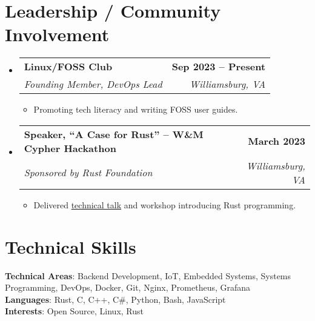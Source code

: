 \documentclass[letterpaper, 11pt]{article}
\makeatletter
\newcommand{\resumeItem}[1]{ \item\small{ {#1 \vspace{-2pt}} } }
\newcommand{\resumeSubheading}[4]{
\vspace{-2pt}
\item
\begin{tabular*}{1.0\textwidth}[t]{l@{\extracolsep{\fill}}r}
	\textbf{#1}       & \textbf{\small #2} \\
	\textit{\small#3} & \textit{\small #4} \\
\end{tabular*}
\vspace{-8pt}
}
\newcommand{\resumeSubHeadingListStart}{\begin{itemize}[leftmargin=0.0in, label={}]}
\newcommand{\resumeSubHeadingListEnd}{\end{itemize}}
\newcommand{\resumeItemListStart}{\vspace{-6pt}\begin{itemize}}
\newcommand{\resumeItemListEnd}{\end{itemize}
\vspace{-6pt}}
\makeatother
\begin{document}
	\section{Leadership / Community Involvement}
	\resumeSubHeadingListStart

	\resumeSubheading {Linux/FOSS Club}{Sep 2023 -- Present} {Founding Member, DevOps Lead}{Williamsburg, VA}
	\resumeItemListStart \resumeItem{Promoting tech literacy and writing FOSS user guides.}
	\resumeItemListEnd

	\resumeSubheading {Speaker, “A Case for Rust” – W\&M Cypher Hackathon}{March 2023}
	{Sponsored by Rust Foundation}{Williamsburg, VA} \resumeItemListStart
	\resumeItem{Delivered \href{https://matthew.science/rust-talk-matthew-esposito.pdf}{technical talk} and workshop introducing Rust programming.} \resumeItemListEnd

	\resumeSubHeadingListEnd

	\section{Technical Skills}
	\begin{itemize}[leftmargin=0.15in, label={}]
		\small{\item{ \textbf{Technical Areas}{: Backend Development, IoT, Embedded Systems, Systems Programming, DevOps, Docker, Git, Nginx, Prometheus, Grafana} \\ \textbf{Languages}{: Rust, C, C++, C\#, Python, Bash, JavaScript} \\ \textbf{Interests}{: Open Source, Linux, Rust} }}
	\end{itemize}
\end{document}
